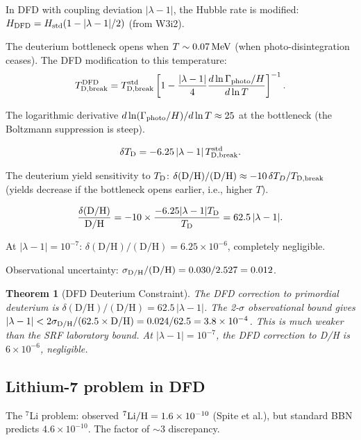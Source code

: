 \documentclass[11pt]{article}
\newtheorem{theorem}{Theorem}
\newcommand{\ee}[1]{\times 10^{#1}}
\newcommand{\lambdaone}{|\lambda-1|}
\newcommand{\DFD}{{\rm DFD}}
\begin{document}
In DFD with coupling deviation $\lambdaone$, the Hubble rate is modified:
$H_\DFD = H_{\rm std}(1 - \lambdaone/2)$ (from W3i2).

The deuterium bottleneck opens when $T \sim 0.07\,{\rm MeV}$ (when
photo-disintegration ceases).  The DFD modification to this temperature:
\begin{equation}
  T_{\rm D,break}^\DFD = T_{\rm D,break}^{\rm std}
  \left[1 - \frac{\lambdaone}{4}
  \frac{d\ln\Gamma_{\rm photo}/H}{d\ln T}\right]^{-1}.
\end{equation}

The logarithmic derivative $d\ln(\Gamma_{\rm photo}/H)/d\ln T \approx 25$
at the bottleneck (the Boltzmann suppression is steep).

\begin{equation}
  \delta T_{\rm D} = -6.25\,\lambdaone\,T_{\rm D,break}^{\rm std}.
\end{equation}

The deuterium yield sensitivity to $T_{\rm D}$:
$\delta(\text{D/H})/(\text{D/H}) \approx -10\,\delta T_D/T_{\rm D,break}$
(yields decrease if the bottleneck opens earlier, i.e., higher $T$).

\begin{equation}
  \frac{\delta(\text{D/H})}{\text{D/H}} = -10\times\frac{-6.25\lambdaone
  T_{\rm D}}{T_{\rm D}} = 62.5\,\lambdaone.
\end{equation}

At $\lambdaone = 10^{-7}$: $\delta(\text{D/H})/(\text{D/H})
= 6.25\ee{-6}$, completely negligible.

Observational uncertainty: $\sigma_{\rm D/H}/(\text{D/H}) = 0.030/2.527 = 0.012$.

\begin{theorem}[DFD Deuterium Constraint]
\label{thm:deuterium}
The DFD correction to primordial deuterium is $\delta(\text{D/H})/(\text{D/H})
= 62.5\,\lambdaone$.  The 2-$\sigma$ observational bound gives
$\lambdaone < 2\sigma_{\rm D/H}/(62.5\times\text{D/H}) = 0.024/62.5 = 3.8\ee{-4}$.
This is much weaker than the SRF laboratory bound.  At $\lambdaone = 10^{-7}$,
the DFD correction to D/H is $6\ee{-6}$, negligible.
\end{theorem}

\subsection{Lithium-7 problem in DFD}

The $^7$Li problem: observed $^7{\rm Li}/{\rm H} = 1.6\ee{-10}$ (Spite et al.),
but standard BBN predicts $4.6\ee{-10}$.  The factor of $\sim 3$ discrepancy.
\end{document}
